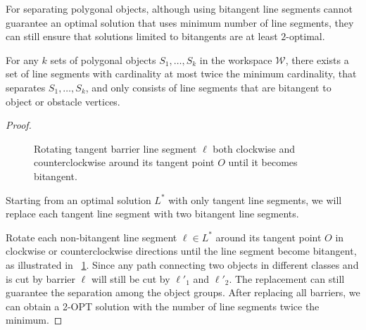 For separating polygonal objects, although using bitangent line segments cannot guarantee an optimal solution that uses minimum number of line segments, they can still ensure that solutions limited to bitangents are at least $2$-optimal.
\begin{proposition}
For any $k$ sets of polygonal objects $S_1, \dots, S_k$ in the workspace $\mathcal W$, there exists a set of line segments with cardinality at most twice the minimum cardinality, that separates $S_1, \dots, S_k$, and only consists of line segments that are bitangent to object or obstacle vertices. 
\end{proposition}
\begin{proof}


\begin{figure}[ht]
    \centering
    \caption{Rotating tangent barrier line segment $\ell$ both clockwise and counterclockwise around its tangent point $O$ until it becomes bitangent.}
    \label{fig:bf-proof_bi_2opt}
\end{figure}

Starting from an optimal solution $L^*$ with only tangent line segments,
we will replace each tangent line segment with two bitangent line segments.

Rotate each non-bitangent line segment $\ell\in L^*$ around its tangent point $O$ in clockwise or 
counterclockwise directions until the line segment become bitangent, 
as illustrated in ~\ref{fig:bf-proof_bi_2opt}. 
Since any path connecting two objects in different classes and is cut by barrier $\ell$ will still be cut by $\ell'_1$ and $\ell'_2$.
The replacement can still guarantee the separation among the object groups.
After replacing all barriers, we can obtain a 2-OPT solution with the number of line segments twice the minimum.
\end{proof}
